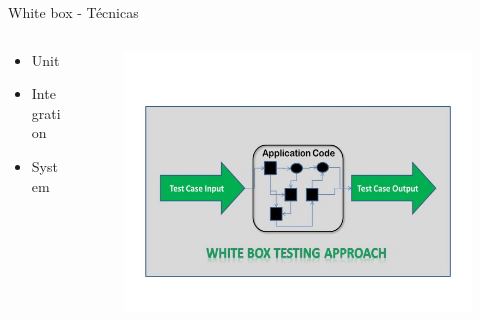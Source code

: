 \documentclass[aspectratio=169]{beamer}
\begin{document}
\begin{frame}{White box - Técnicas}
\begin{columns}[T]
	\begin{column}[T]{4cm}
		\begin{itemize}
			\item Unit
			\item Integration
			\item System

		\end{itemize}
	\end{column}
	\begin{column}[T]{6cm} %
		\begin{figure}
			\centering
			\includegraphics[width=\linewidth]{Images/whiteboxtesting.jpg}
		\end{figure}
	\end{column}
\end{columns}
\end{frame}
\end{document}

